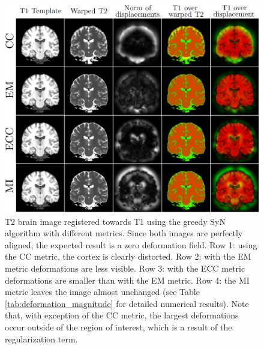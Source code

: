 \begin{figure}[t!]
\centering
\includegraphics[width=1.0\linewidth]{./images/t1_t2_reg_pannel.png}
\caption{T2 brain image registered towards T1 using the greedy SyN algorithm with different metrics. Since both images are perfectly aligned, the expected result is a zero deformation field. Row 1: using the CC metric, the cortex is clearly distorted. Row 2: with the EM metric deformations are less visible. Row 3: with the ECC metric deformations are smaller than with the EM metric. Row 4: the MI metric leaves the image almost unchanged (see Table \ref{tab:deformation_magnitude} for detailed numerical results). Note that, with exception of the CC metric, the largest deformations occur outside of the region of interest, which is a result of the regularization term.}
\label{fig:t1_t2_reg_pannel}
\end{figure}

